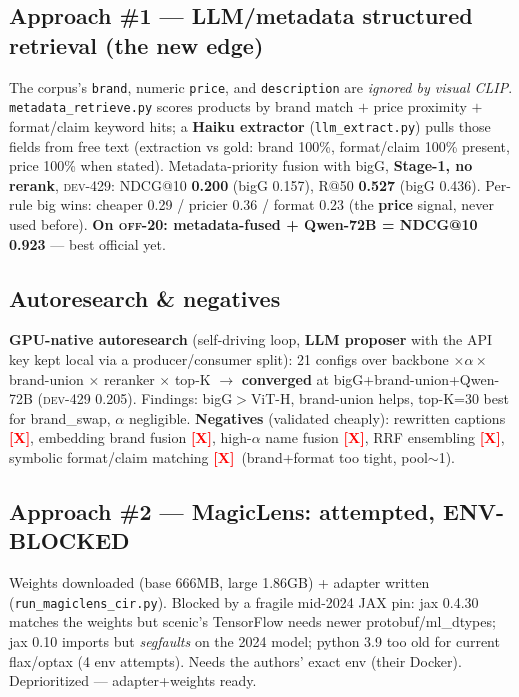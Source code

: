 \documentclass[10pt]{article}
\newcommand{\dev}{\textsc{dev}}
\newcommand{\off}{\textsc{off-20}}
\newcommand{\bad}{\textcolor{red}{\textbf{[X]}}}
\begin{document}
\subsection{Approach \#1 --- LLM/metadata structured retrieval (the new edge)}
The corpus's \texttt{brand}, numeric \texttt{price}, and \texttt{description} are \emph{ignored by visual
CLIP}. \texttt{metadata\_retrieve.py} scores products by brand match $+$ price proximity $+$ format/claim
keyword hits; a \textbf{Haiku extractor} (\texttt{llm\_extract.py}) pulls those fields from free text
(extraction vs gold: brand 100\%, format/claim 100\% present, price 100\% when stated). Metadata-priority
fusion with bigG, \textbf{Stage-1, no rerank}, \dev-429: NDCG@10 \textbf{0.200} (bigG 0.157), R@50
\textbf{0.527} (bigG 0.436). Per-rule big wins: cheaper 0.29 / pricier 0.36 / format 0.23 (the \textbf{price}
signal, never used before). \textbf{On \off: metadata-fused + Qwen-72B = NDCG@10 0.923} --- best official yet.

\subsection{Autoresearch \& negatives}
\textbf{GPU-native autoresearch} (self-driving loop, \textbf{LLM proposer} with the API key kept local via a
producer/consumer split): 21 configs over backbone $\times \alpha \times$ brand-union $\times$ reranker
$\times$ top-K $\to$ \textbf{converged} at bigG+brand-union+Qwen-72B (\dev-429 0.205). Findings: bigG$>$ViT-H,
brand-union helps, top-K=30 best for brand\_swap, $\alpha$ negligible. \textbf{Negatives} (validated cheaply):
rewritten captions \bad, embedding brand fusion \bad, high-$\alpha$ name fusion \bad, RRF ensembling \bad,
symbolic format/claim matching \bad\ (brand+format too tight, pool$\sim$1).

\subsection{Approach \#2 --- MagicLens: attempted, ENV-BLOCKED}
Weights downloaded (base 666MB, large 1.86GB) + adapter written (\texttt{run\_magiclens\_cir.py}). Blocked by
a fragile mid-2024 JAX pin: jax 0.4.30 matches the weights but scenic's TensorFlow needs newer
protobuf/ml\_dtypes; jax 0.10 imports but \emph{segfaults} on the 2024 model; python 3.9 too old for current
flax/optax (4 env attempts). Needs the authors' exact env (their Docker). Deprioritized --- adapter+weights ready.

\end{document}
